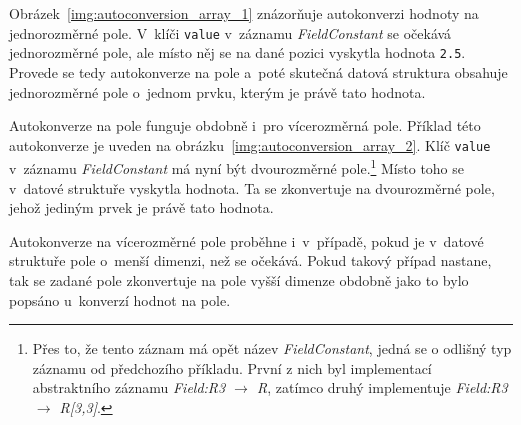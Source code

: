 \documentclass[FM,bw,DP]{tulthesis}
\begin{document}
Obrázek~\ref{img:autoconversion_array_1} znázorňuje autokonverzi hodnoty na jednorozměrné pole. V~klíči \texttt{value} v~záznamu \textit{FieldConstant} se očekává jednorozměrné pole, ale místo něj se na dané pozici vyskytla hodnota \texttt{2.5}. Provede se tedy autokonverze na pole a~poté skutečná datová struktura obsahuje jednorozměrné pole o~jednom prvku, kterým je právě tato hodnota.

Autokonverze na pole funguje obdobně i~pro vícerozměrná pole. Příklad této autokonverze je uveden na obrázku~\ref{img:autoconversion_array_2}. Klíč \texttt{value} v~záznamu \textit{FieldConstant} má nyní být dvourozměrné pole.\footnote{Přes to, že tento záznam má opět název \textit{FieldConstant}, jedná se o odlišný typ záznamu od předchozího příkladu. První z nich byl implementací abstraktního záznamu \textit{Field:R3 $\rightarrow$ R}, zatímco druhý implementuje \textit{Field:R3 $\rightarrow$ R[3,3]}.} Místo toho se v~datové struktuře vyskytla hodnota. Ta se zkonvertuje na dvourozměrné pole, jehož jediným prvek je právě tato hodnota.

Autokonverze na vícerozměrné pole proběhne i~v~případě, pokud je v~datové struktuře pole o~menší dimenzi, než se očekává. Pokud takový případ nastane, tak se zadané pole zkonvertuje na pole vyšší dimenze obdobně jako to bylo popsáno u~konverzí hodnot na pole.
\end{document}
